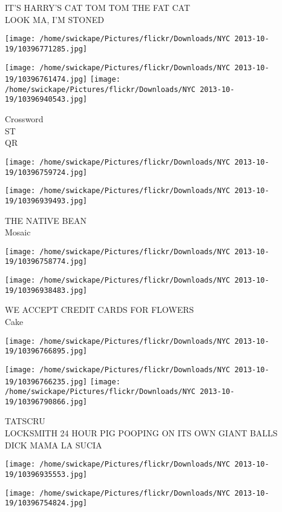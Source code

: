 \documentclass[10pt,letterpaper]{article}
\begin{document}
IT'S HARRY'S CAT TOM TOM THE FAT CAT\\
LOOK MA, I'M STONED
\pagebreak

\texttt{[image: /home/swickape/Pictures/flickr/Downloads/NYC 2013-10-19/10396771285.jpg]}

\vspace{0.25in}
\texttt{[image: /home/swickape/Pictures/flickr/Downloads/NYC 2013-10-19/10396761474.jpg]}
\texttt{[image: /home/swickape/Pictures/flickr/Downloads/NYC 2013-10-19/10396940543.jpg]}

Crossword\\
ST\\
QR
\pagebreak

\texttt{[image: /home/swickape/Pictures/flickr/Downloads/NYC 2013-10-19/10396759724.jpg]}

\vspace{0.25in}
\texttt{[image: /home/swickape/Pictures/flickr/Downloads/NYC 2013-10-19/10396939493.jpg]}

THE NATIVE BEAN\\
Mosaic
\pagebreak

\texttt{[image: /home/swickape/Pictures/flickr/Downloads/NYC 2013-10-19/10396758774.jpg]}

\vspace{0.25in}
\texttt{[image: /home/swickape/Pictures/flickr/Downloads/NYC 2013-10-19/10396938483.jpg]}

WE ACCEPT CREDIT CARDS FOR FLOWERS\\
Cake
\pagebreak

\texttt{[image: /home/swickape/Pictures/flickr/Downloads/NYC 2013-10-19/10396766895.jpg]}

\vspace{0.25in}
\texttt{[image: /home/swickape/Pictures/flickr/Downloads/NYC 2013-10-19/10396766235.jpg]}
\texttt{[image: /home/swickape/Pictures/flickr/Downloads/NYC 2013-10-19/10396790866.jpg]}

TATSCRU\\
LOCKSMITH 24 HOUR PIG POOPING ON ITS OWN GIANT BALLS\\
DICK MAMA LA SUCIA
\pagebreak

\texttt{[image: /home/swickape/Pictures/flickr/Downloads/NYC 2013-10-19/10396935553.jpg]}

\vspace{0.25in}
\texttt{[image: /home/swickape/Pictures/flickr/Downloads/NYC 2013-10-19/10396754824.jpg]}
\end{document}
